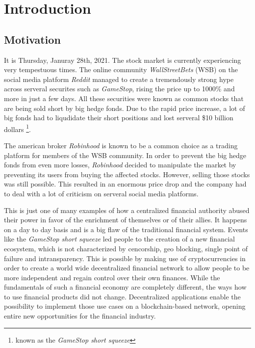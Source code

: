 \chapter{Introduction}
\label{cha:Introduction}

\section{Motivation}
It is Thursday, Januray 28th, 2021. The stock market is currently experiencing very tempestuous times. The online community \textit{WallStreetBets} (WSB)
on the social media platform \textit{Reddit} managed to create a tremendously strong hype across serveral securites such as \textit{GameStop}, rising
the price up to 1000\% and more in just a few days. All these securities were known as common stocks that are being sold short by big hedge fonds.
Due to the rapid price increase, a lot of big fonds had to liqudidate their short positions and lost serveral \$10 billion dollars \footnote{known as the \textit{GameStop short squeeze}}.

The american
broker \textit{Robinhood} is known to be a common choice as a trading platform for members of the WSB community. In order to prevent the big hedge
fonds from even more losses, \textit{Robinhood} decided to manipulate the market by preventing its users from buying the affected stocks. However, selling those
stocks was still possible. This resulted in an enormous price drop and the company had to deal with a lot of criticism on serveral social media platforms.

This is just one of many examples of how a centralized financial authority abused their power in favor of the enrichment of themselves or of their allies.
It happens on a day to day basis and is a big flaw of the traditional financial system. Events like the \textit{GameStop short squeeze} led people to
the creation of a new financial ecosystem, which is not characterized by cencorship, geo blocking, single point of failure and intransparency. This is
possible by making use of cryptocurrencies in order to create a world wide decentralized financial network to allow people to be more independent and
regain control over their own finances. While the fundamentals of such a financial economy are completely different, the ways how to use financial
products did not change. Decentralized applications enable the possibility to implement those use cases on a blockchain-based network, opening entire
new opportunities for the financial industry.


